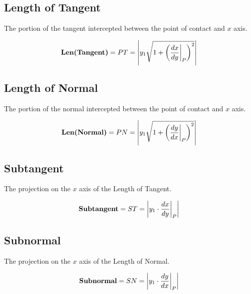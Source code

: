 \documentclass{article}
\begin{document}
\subsection{Length of Tangent}
The portion of the tangent intercepted between the point of contact and $x$ axis.

$$\textbf{Len(Tangent)}=PT=\abs{y_{1}\displaystyle\sqrt{1+\left(\dv{x}{y}\biggr\rvert_{P}\right)^2}}$$

\subsection{Length of Normal}
The portion of the normal intercepted between the point of contact and $x$ axis.

$$\textbf{Len(Normal)}=PN=\abs{y_{1}\displaystyle\sqrt{1+\left(\dv{y}{x} \biggr\rvert_{P}\right)^2}}$$

\subsection{Subtangent}
The projection on the $x$ axis of the Length of Tangent.

$$\textbf{Subtangent}=ST=\abs{y_{1}\cdot \dv{x}{y} \biggr\rvert_{P}}$$

\subsection{Subnormal}
The projection on the $x$ axis of the Length of Normal.

$$\textbf{Subnormal}=SN=\abs{y_{1}\cdot \dv{y}{x} \biggr\rvert_{P}}$$
\end{document}
